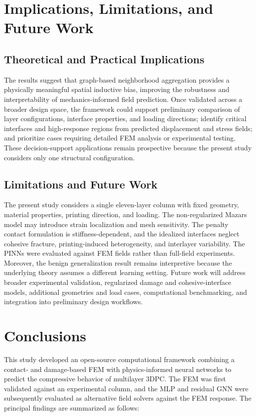 \documentclass[review, authoryear, 12pt]{elsarticle}
\begin{document}
\section{Implications, Limitations, and Future Work}

\subsection{Theoretical and Practical Implications}

The results suggest that graph-based neighborhood aggregation provides a physically meaningful spatial inductive bias, improving the robustness and interpretability of mechanics-informed field prediction. Once validated across a broader design space, the framework could support preliminary comparison of layer configurations, interface properties, and loading directions; identify critical interfaces and high-response regions from predicted displacement and stress fields; and prioritize cases requiring detailed FEM analysis or experimental testing. These decision-support applications remain prospective because the present study considers only one structural configuration.

\subsection{Limitations and Future Work}

The present study considers a single eleven-layer column with fixed geometry, material properties, printing direction, and loading. The non-regularized Mazars model may introduce strain localization and mesh sensitivity. The penalty contact formulation is stiffness-dependent, and the idealized interfaces neglect cohesive fracture, printing-induced heterogeneity, and interlayer variability. The PINNs were evaluated against FEM fields rather than full-field experiments. Moreover, the benign generalization result remains interpretive because the underlying theory assumes a different learning setting. Future work will address broader experimental validation, regularized damage and cohesive-interface models, additional geometries and load cases, computational benchmarking, and integration into preliminary design workflows.

\section{Conclusions}

This study developed an open-source computational framework combining a contact- and damage-based FEM with physics-informed neural networks to predict the compressive behavior of multilayer 3DPC. The FEM was first validated against an experimental column, and the MLP and residual GNN were subsequently evaluated as alternative field solvers against the FEM response. The principal findings are summarized as follows:
\end{document}

